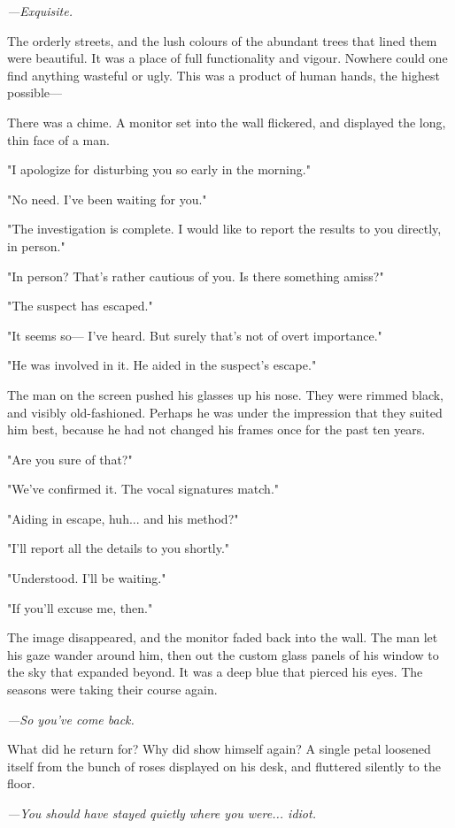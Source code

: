 \emph{---Exquisite.}

The orderly streets, and the lush colours of the abundant trees that
lined them were beautiful. It was a place of full functionality and
vigour. Nowhere could one find anything wasteful or ugly. This was a
product of human hands, the highest possible---

There was a chime. A monitor set into the wall flickered, and displayed
the long, thin face of a man.

"I apologize for disturbing you so early in the morning."

"No need. I've been waiting for you."

"The investigation is complete. I would like to report the results to
you directly, in person."

"In person? That's rather cautious of you. Is there something amiss?"

"The suspect has escaped."

"It seems so--- I've heard. But surely that's not of overt importance."

"He was involved in it. He aided in the suspect's escape."

The man on the screen pushed his glasses up his nose. They were rimmed
black, and visibly old-fashioned. Perhaps he was under the impression
that they suited him best, because he had not changed his frames once
for the past ten years.

"Are you sure of that?"

"We've confirmed it. The vocal signatures match."

"Aiding in escape, huh... and his method?"

"I'll report all the details to you shortly."

"Understood. I'll be waiting."

"If you'll excuse me, then."

The image disappeared, and the monitor faded back into the wall. The man
let his gaze wander around him, then out the custom glass panels of his
window to the sky that expanded beyond. It was a deep blue that pierced
his eyes. The seasons were taking their course again.

\emph{---So you've come back.}

What did he return for? Why did show himself again? A single petal
loosened itself from the bunch of roses displayed on his desk, and
fluttered silently to the floor.

\emph{---You should have stayed quietly where you were... idiot.}

